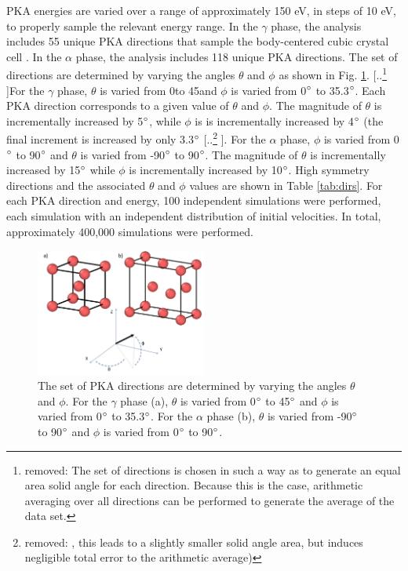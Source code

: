 \documentclass[review]{elsarticle}
\providecommand{\DIFdeltex}[1]{{\protect\color{red} [..\footnote{removed: #1} ]}} %
\providecommand{\DIFdelbegin}{} %
\providecommand{\DIFdelend}{} %
\providecommand{\DIFaddbeginFL}{} %
\providecommand{\DIFaddendFL}{} %
\providecommand{\DIFdelbeginFL}{} %
\providecommand{\DIFdelendFL}{} %
\providecommand{\DIFdel}[1]{\texorpdfstring{\DIFdeltex{#1}}{}} %
\newcommand{\DIFscaledelfig}{0.5}
\newlength{\DIFdelgraphicswidth} %
\newlength{\DIFdelgraphicsheight} %
\newcommand{\DIFaddincludegraphics}[2][]{{\color{blue}\fbox{\DIFOincludegraphics[#1]{#2}}}} %
\newcommand{\DIFdelincludegraphics}[2][]{%
\sbox{\DIFdelgraphicsbox}{\DIFOincludegraphics[#1]{#2}}%
\settoboxwidth{\DIFdelgraphicswidth}{\DIFdelgraphicsbox} %
\settoboxtotalheight{\DIFdelgraphicsheight}{\DIFdelgraphicsbox} %
\scalebox{\DIFscaledelfig}{%
\parbox[b]{\DIFdelgraphicswidth}{\usebox{\DIFdelgraphicsbox}\\[-\baselineskip] \rule{\DIFdelgraphicswidth}{0em}}\llap{\resizebox{\DIFdelgraphicswidth}{\DIFdelgraphicsheight}{%
\setlength{\unitlength}{\DIFdelgraphicswidth}%
\begin{picture}(1,1)%
\thicklines\linethickness{2pt} %
{\color[rgb]{1,0,0}\put(0,0){\framebox(1,1){}}}%
{\color[rgb]{1,0,0}\put(0,0){\line( 1,1){1}}}%
{\color[rgb]{1,0,0}\put(0,1){\line(1,-1){1}}}%
\end{picture}%
}\hspace*{3pt}}} %
} %
\DeclareRobustCommand{\DIFdelbegin}{\DIFOdelbegin \let\includegraphics\DIFdelincludegraphics} %
\DeclareRobustCommand{\DIFdelend}{\DIFOaddend \let\includegraphics\DIFOincludegraphics} %
\DeclareRobustCommand{\DIFaddbeginFL}{\DIFOaddbeginFL \let\includegraphics\DIFaddincludegraphics} %
\DeclareRobustCommand{\DIFaddendFL}{\DIFOaddendFL \let\includegraphics\DIFOincludegraphics} %
\DeclareRobustCommand{\DIFdelbeginFL}{\DIFOdelbeginFL \let\includegraphics\DIFdelincludegraphics} %
\DeclareRobustCommand{\DIFdelendFL}{\DIFOaddendFL \let\includegraphics\DIFOincludegraphics} %
\begin{document}
PKA energies are varied over a range of approximately 150 eV, in steps of 10 eV, to properly sample the relevant energy range. In the $\gamma$ phase, the analysis includes 55 unique PKA directions that sample the body-centered cubic crystal cell \cite{beeler2015}. In the $\alpha$ phase, the analysis includes 118 unique PKA directions. The set of directions are determined by varying the angles $\theta$ and $\phi$ as shown in Fig. \ref{fig:directions}. \DIFdelbegin \DIFdel{The set of directions is chosen in such a way as to generate an equal area solid angle for each direction. Because this is the case, arithmetic averaging over all directions can be performed to generate the average of the data set. }\DIFdelend For the $\gamma$ phase, $\theta$ is varied from 0\degree to 45\degree and $\phi$ is varied from 0$\degree$ to 35.3$\degree$. Each PKA direction corresponds to a given value of $\theta$ and $\phi$. The magnitude of $\theta$ is incrementally increased by 5$\degree$, while $\phi$ is is incrementally increased by 4$\degree$ (the final increment is increased by only 3.3$\degree$\DIFdelbegin \DIFdel{, this leads to a slightly smaller solid angle area, but induces negligible total error to the arithmetic average)}\DIFdelend . For the $\alpha$ phase, $\phi$ is varied from 0$\degree$ to 90$\degree$ and $\theta$ is varied from -90$\degree$ to 90$\degree$. The magnitude of $\theta$ is incrementally increased by 15$\degree$  while $\phi$ is incrementally increased by 10$\degree$. High symmetry directions and the associated $\theta$ and $\phi$ values are shown in Table \ref{tab:dirs}. For each PKA direction and energy, 100 independent simulations were performed, each simulation with an independent distribution of initial velocities. In total, approximately 400,000 simulations were performed. 



\begin{figure}[h]
 \centering
 \DIFdelbeginFL %
\DIFdelendFL \DIFaddbeginFL \includegraphics[width=0.5\textwidth]{directionsD.png} 
 \DIFaddendFL \caption{The set of PKA directions are determined by varying the angles $\theta$ and $\phi$. For the $\gamma$ phase (a), $\theta$ is varied from 0$\degree$ to 45$\degree$ and $\phi$ is varied from 0$\degree$ to 35.3$\degree$. For the $\alpha$ phase (b), $\theta$ is varied from -90$\degree$ to 90$\degree$ and $\phi$ is varied from 0$\degree$ to 90$\degree$.}
 \label{fig:directions}
\end{figure}
\end{document}

